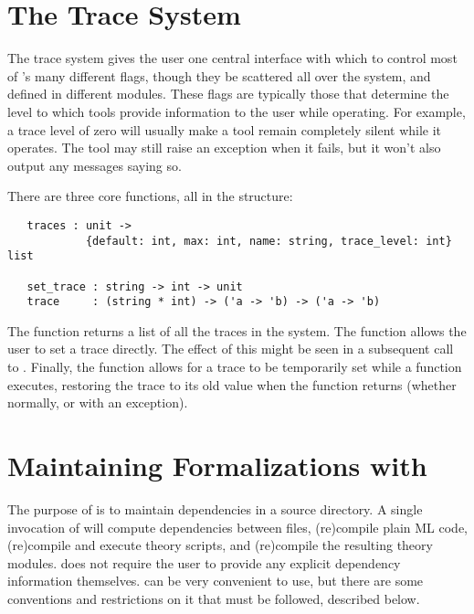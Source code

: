 \section{The Trace System}
\label{sec:traces}

The trace system gives the user one central interface with which to control most of \HOL's many different flags, though they be scattered all over the system, and defined in different modules.
These flags are typically those that determine the level to which \HOL{} tools provide information to the user while operating.
For example, a trace level of zero will usually make a tool remain completely
silent while it operates.
The tool may still raise an exception when it fails, but it won't also
output any messages saying so.

There are three core functions, all in the  structure:
\begin{hol}
\begin{verbatim}
   traces : unit ->
            {default: int, max: int, name: string, trace_level: int} list

   set_trace : string -> int -> unit
   trace     : (string * int) -> ('a -> 'b) -> ('a -> 'b)
\end{verbatim}
\end{hol}

The  function returns a list of all the traces in the system.
The  function allows the user to set a trace directly.
The effect of this might be seen in a subsequent call to .
Finally, the  function allows for a trace to be temporarily set while a function executes, restoring the trace to its old value when the function returns (whether normally, or with an exception).



\section{\texorpdfstring{Maintaining \HOL{} Formalizations with \holmake}{Maintaining HOL Formalizations with \holmake}}
\label{Holmake}

The purpose of \holmake{} is to maintain dependencies in a \HOL{}
source directory. A single invocation of \holmake{} will compute
dependencies between files, (re)compile plain ML code, (re)compile and
execute theory scripts, and (re)compile the resulting theory modules.
\holmake{} does not require the user to provide any explicit
dependency information themselves. \holmake{} can be very convenient
to use, but there are some conventions and restrictions on it that
must be followed, described below.




